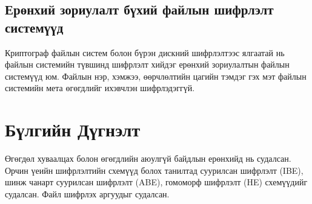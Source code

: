 \subsection*{Ерөнхий зориулалт бүхий файлын шифрлэлт системүүд}

Криптограф файлын систем болон бүрэн дискний шифрлэлтээс ялгаатай нь файлын системийн түвшинд шифрлэлт хийдэг ерөнхий зориулалтын файлын системүүд юм. Файлын нэр, хэмжээ, өөрчлөлтийн цагийн тэмдэг гэх мэт файлын системийн мета өгөгдлийг ихэвчлэн шифрлэдэггүй.


\section{Бүлгийн Дүгнэлт}

Өгөгдөл хуваалцах болон өгөгдлийн аюулгүй байдлын ерөнхийд нь судалсан. Орчин үеийн шифрлэлтийн схемүүд болох танилтад суурилсан шифрлэлт (IBE), шинж чанарт суурилсан шифрлэлт (ABE), гомоморф шифрлэлт (HE) схемүүдийг судалсан. Файл шифрлэх аргуудыг судалсан.